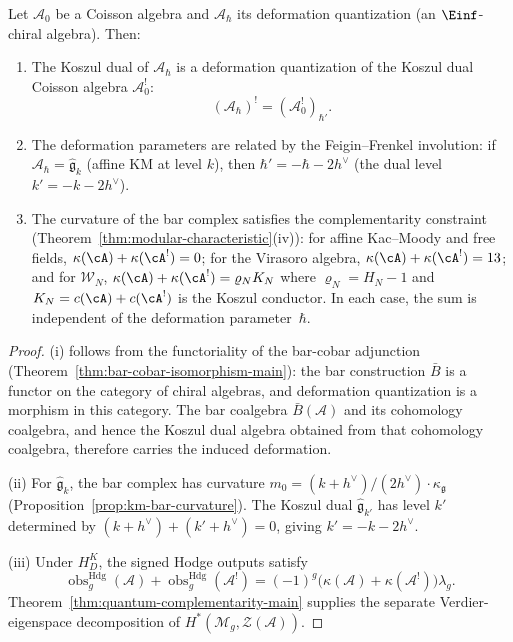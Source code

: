 \begin{theorem}
\label{thm:dq-koszul-compatible}
Let $\mathcal{A}_0$ be a Coisson algebra and
$\mathcal{A}_\hbar$ its deformation quantization (an $\Einf$-chiral
algebra). Then:
\begin{enumerate}
\item The Koszul dual of $\mathcal{A}_\hbar$ is a deformation
quantization of the Koszul dual Coisson algebra $\mathcal{A}_0^!$:
\[
(\mathcal{A}_\hbar)^! = (\mathcal{A}_0^!)_{\hbar'}.
\]
\item The deformation parameters are related by the Feigin--Frenkel
involution: if $\mathcal{A}_\hbar = \widehat{\mathfrak{g}}_k$
(affine KM at level $k$), then $\hbar' = -\hbar - 2h^\vee$
(the dual level $k' = -k - 2h^\vee$).
\item The curvature of the bar complex satisfies
the complementarity constraint
(Theorem~\ref{thm:modular-characteristic}\textup{(iv)}):
for affine Kac--Moody and free fields,
$\kappa(\cA) + \kappa(\cA^!) = 0$;
for the Virasoro algebra,
$\kappa(\cA) + \kappa(\cA^!) = 13$; and
for $\mathcal{W}_N$,
$\kappa(\cA) + \kappa(\cA^!) = \varrho_N K_N$
where $\varrho_N = H_N - 1$ and
$K_N = c(\cA) + c(\cA^!)$ is the Koszul conductor.
In each case, the sum is independent of the
deformation parameter~$\hbar$.
\end{enumerate}
\end{theorem}

\begin{proof}
(i) follows from the functoriality of the bar-cobar adjunction
(Theorem~\ref{thm:bar-cobar-isomorphism-main}): the bar construction
$\bar{B}$ is a functor on the category of chiral algebras, and
deformation quantization is a morphism in this category. The
bar coalgebra $\bar{B}(\mathcal{A})$ and its cohomology coalgebra,
and hence the Koszul dual algebra obtained from that cohomology
coalgebra, therefore
carries the induced deformation.

(ii) For $\widehat{\mathfrak{g}}_k$, the bar complex has curvature
$m_0 = (k + h^\vee)/(2h^\vee) \cdot \kappa_{\mathfrak{g}}$
(Proposition~\ref{prop:km-bar-curvature}). The Koszul dual
$\widehat{\mathfrak{g}}_{k'}$ has level $k'$ determined by
$(k + h^\vee) + (k' + h^\vee) = 0$, giving $k' = -k - 2h^\vee$.

(iii) Under $H_D^K$, the signed Hodge outputs satisfy
\[
 \operatorname{obs}^{\mathrm{Hdg}}_g(\mathcal A)
 +\operatorname{obs}^{\mathrm{Hdg}}_g(\mathcal A^!)
 =(-1)^g\bigl(\kappa(\mathcal A)+\kappa(\mathcal A^!)\bigr)\lambda_g.
\]
Theorem~\ref{thm:quantum-complementarity-main} supplies the separate
Verdier-eigenspace decomposition of
$H^*(\mathcal M_g,\mathcal Z(\mathcal A))$.
\end{proof}

